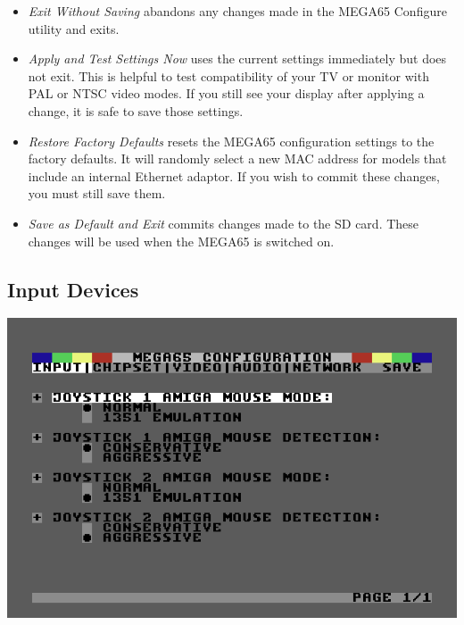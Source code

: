 \begin{itemize}
  \item{\em Exit Without Saving} abandons any changes made in the MEGA65 Configure utility and exits.
  \item{\em Apply and Test Settings Now} uses the current settings immediately but does not exit. This is helpful to test compatibility of your TV or monitor with PAL or NTSC video modes. If you still see your display after applying a change, it is safe to save those settings.
  \item{\em Restore Factory Defaults} resets the MEGA65 configuration settings to the factory defaults. It will randomly select a new MAC address for models that include an internal Ethernet adaptor. If you wish to commit these changes, you must still save them.
  \item{\em Save as Default and Exit} commits changes made to the SD card. These changes will be used when the MEGA65 is switched on.
\end{itemize}

\subsection{Input Devices}

\begin{center}
\includegraphics[width=0.7\linewidth]{images/ss-m65config-1.png}
\end{center}

